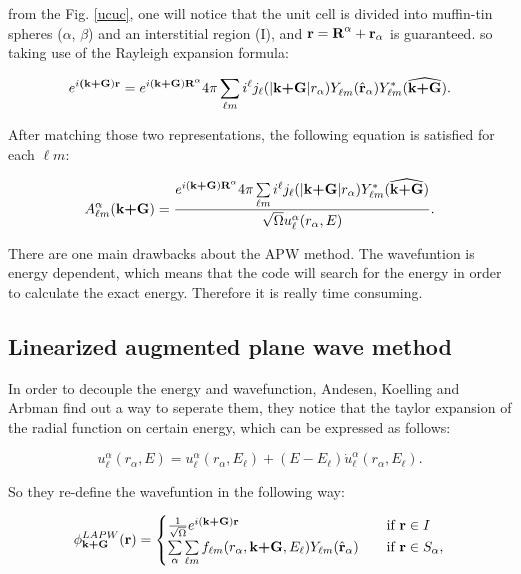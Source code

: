 \documentclass[a4paper, 12pt, titlepage,oneside,drop]{kthesis}
\begin{document}
\noindent from the Fig. \ref{ucuc}, one will notice that the unit cell is divided into muffin-tin spheres ($\alpha$, $\beta$) and an
interstitial region (I), and ${\textbf r={\textbf R^{\alpha}}+{\textbf r_{\alpha}}}$ is guaranteed. so taking use of the Rayleigh expansion formula:

\begin{equation}
\expg<(\textbf {k+G})>= e^{i (\textbf {k+G}) \textbf{R}^{\alpha} } 4 \pi \sumlm<\ell><m> i^{\ell} \bessf< |\textbf{k+G}|> \sphfr<\ell{m}><r><> \sphfq<\ell{m}><\textbf{k+G}><*> .
\end{equation}
  
\noindent After matching those two representations, the following equation is satisfied for each ${\ell}m$:

\begin{equation}
A _{{\ell}m}^{\alpha} (\textbf {k+G})= \frac{ e^{i (\textbf {k+G}) \textbf{R}^{\alpha} } 4 \pi \sumlm<\ell><m> i^{\ell} \bessf< |\textbf{k+G}|> \sphfq<\ell{m}><\textbf{k+G}><*> }{\sqrt{\Omega} u_{{\ell}}^{\alpha}(r_{\alpha}, E)}.
\end{equation}

\noindent There are one main drawbacks about the APW method. The wavefuntion is energy dependent, which means that
 the code will search for the energy in order to calculate the exact energy. Therefore it 
is really time consuming. 

\subsection{Linearized augmented plane wave method}
\noindent In order to decouple the energy and wavefunction, Andesen, Koelling and Arbman find out a way to seperate them, they notice that the taylor expansion of the radial function
on certain energy, which can be expressed as follows:

\begin{equation}\label{ap3}
 u_{{\ell}}^{\alpha}(r_{\alpha}, E) = u_{{\ell}}^{\alpha}(r_{\alpha}, E_{\ell}) + (E-E_{\ell}) \dot{u}_{{\ell}}^{\alpha}(r_{\alpha}, E_{\ell}).
\end{equation}

\noindent So they re-define the wavefuntion in the following way:


\begin{equation}\label{lap4}
\phi^{LAPW}_\textbf{k+G} (\textbf{r})= 
\begin{cases} \frac {1}{\sqrt{\Omega}} e^{i(\textbf{k+G})\textbf{r}} & \quad \mbox{if $\textbf{r} \in I $}
\\
\sumg<\alpha>\sum\limits_{{\ell}m} f_{{\ell}{m}} (r_{\alpha},\textbf{k+G}, E_{\ell}) Y_{{\ell}m}(\hat{\textbf{r}}_{\alpha})  & \quad \mbox{if $\textbf{r} \in S_\alpha, $}\\ 
\end{cases}
\end{equation}
\end{document}
